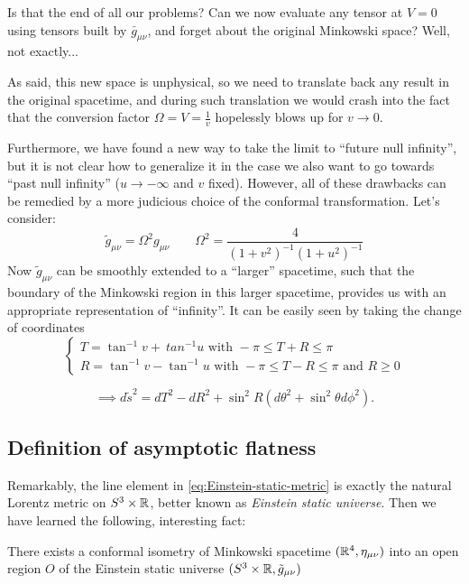 Is that the end of all our problems? Can we now evaluate any tensor at \(V = 0\) using tensors built by \(\bar{g}_{\mu\nu}\), and forget about the original Minkowski space?
Well, not exactly...

\noindent As said, this new space is unphysical, so we need to translate back any result in the original spacetime, and during such translation we would crash into the fact that the conversion factor \(\Omega = V= \frac{1}{v}\) hopelessly blows up for \(v \rightarrow 0\).

Furthermore, we have found a new way to take the limit to ``future null infinity'', but it is not clear how to generalize it in the case we also want to go towards ``past null infinity'' (\(u \rightarrow -\infty\) and \(v\) fixed). However, all of these drawbacks can be remedied by a more judicious choice of the conformal transformation. Let's consider:
\[
\tilde{g}_{\mu\nu} = \Omega^2 g_{\mu\nu} \quad\quad \Omega^2 = \frac{4}{(1 + v^2)^{-1}(1 + u^2)^{-1}} 
\]
Now \(\tilde{g}_{\mu\nu}\) can be smoothly extended to a ``larger'' spacetime, such that the boundary of the Minkowski region in this larger spacetime, provides us with an appropriate representation of ``infinity''.
It can be easily seen by taking the change of coordinates
\[
\begin{cases}
T = \tan^{-1}v +\ tan^{-1}u \text{ with } -\pi \le T + R \le \pi\\
R = \tan^{-1}v - \tan^{-1}u \text{ with } -\pi \le T - R \le \pi \text{ and } R \ge 0
\end{cases}
\]

\begin{equation}
\label{eq:Einstein-static-metric}
	\implies
	d\tilde{s}^2 = dT^2 - dR^2 + \sin^2R(d\theta^2 + \sin^2\theta d\phi^2).
\end{equation}

\subsection{Definition of asymptotic flatness}
Remarkably, the line element in \eqref{eq:Einstein-static-metric} is exactly the natural Lorentz metric on \(S^3 \times {\mathbb{R}}\), better known as \emph{Einstein static universe}. Then we have learned the following, interesting fact:
\begin{prop}
	There exists a conformal isometry of Minkowski spacetime \(({\mathbb{R}}^4, \eta_{\mu\nu})\) into an open region \(O\) of the Einstein static universe \((S^3 \times {\mathbb{R}}, \tilde{g}_{\mu\nu})\)
\end{prop}

